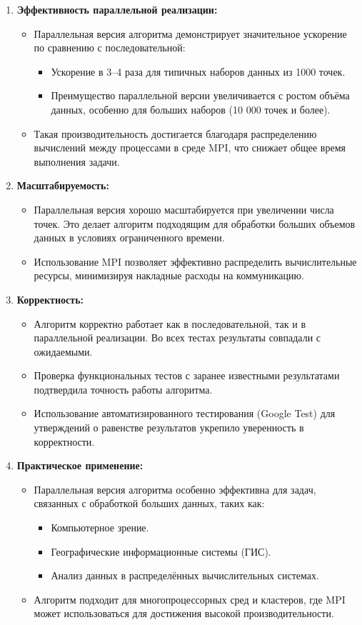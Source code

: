 \documentclass[a4paper,12pt]{article}
\begin{document}
\begin{enumerate}
    \item \textbf{Эффективность параллельной реализации:}
	\begin{itemize}
		 \item Параллельная версия алгоритма демонстрирует значительное ускорение по сравнению с последовательной:
		\begin{itemize}
		        \item Ускорение в 3–4 раза для типичных наборов данных из 1000 точек.
		        \item Преимущество параллельной версии увеличивается с ростом объёма данных, особенно для больших наборов (10 000 точек и более).
	    	\end{itemize}
		\item Такая производительность достигается благодаря распределению вычислений между процессами в среде MPI, что снижает общее время выполнения задачи.
	\end{itemize}
    \item \textbf{Масштабируемость:}
	\begin{itemize}
	        \item Параллельная версия хорошо масштабируется при увеличении числа точек. Это делает алгоритм подходящим для обработки больших объемов данных в условиях ограниченного времени.
	        \item Использование MPI позволяет эффективно распределить вычислительные ресурсы, минимизируя накладные расходы на коммуникацию.
	\end{itemize}
    \item \textbf{Корректность:}
	\begin{itemize}
		\item Алгоритм корректно работает как в последовательной, так и в параллельной реализации. Во всех тестах результаты совпадали с ожидаемыми.
		\item Проверка функциональных тестов с заранее известными результатами подтвердила точность работы алгоритма.
		\item Использование автоматизированного тестирования (Google Test) для утверждений о равенстве результатов укрепило уверенность в корректности.
	\end{itemize}
    \item \textbf{Практическое применение:}
	\begin{itemize}
	        \item Параллельная версия алгоритма особенно эффективна для задач, связанных с обработкой больших данных, таких как:
			\begin{itemize}
				\item Компьютерное зрение.
				\item Географические информационные системы (ГИС).
				\item Анализ данных в распределённых вычислительных системах.
			\end{itemize}
	        \item Алгоритм подходит для многопроцессорных сред и кластеров, где MPI может использоваться для достижения высокой производительности.
	    \end{itemize}
\end{enumerate}
\end{document}
